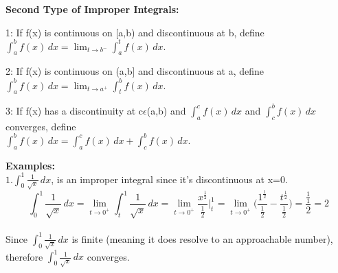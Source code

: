 \documentclass[12pt, letterpaper]{article}
\begin{document}
    \begin{flushleft}\textbf{Second Type of Improper Integrals:}\end{flushleft}
    \begin{description}
        \item 1: If f(x) is continuous on [a,b) and discontinuous at b, define\\$\int_a^bf(x)\,dx=\lim_{t \to b^-}\int_a^tf(x)\,dx$.
        \item 2: If f(x) is continuous on (a,b] and discontinuous at a, define\\$\int_a^bf(x)\,dx=\lim_{t \to a^+}\int_t^bf(x)\,dx$.
        \item 3: If f(x) has a discontinuity at c$\epsilon$(a,b) and $\int_a^cf(x)\,dx$ and $\int_c^bf(x)\,dx$ converges, define\\$\int_a^bf(x)\,dx=\int_a^cf(x)\,dx+\int_c^bf(x)\,dx$.
    \end{description}
    \begin{flushleft}
        \textbf{Examples:}\\
        $1. \int_0^1\frac{1}{\sqrt{x}}\,dx$, is an improper integral since it's discontinuous at x=0.\\
        $$\int_0^1\frac{1}{\sqrt{x}}\,dx=\lim_{t \to 0^+}\int_t^1\frac{1}{\sqrt{x}}\,dx=\lim_{t \to 0^+}\frac{x^{\frac{1}{2}}}{\frac{1}{2}}\bigg|_t^1=\lim_{t \to 0^+}\bigg(\frac{1^{\frac{1}{2}}}{\frac{1}{2}}-\frac{t^{\frac{1}{2}}}{\frac{1}{2}}\bigg)=\frac{\frac{1}{1}}{2}=2$$\\
        Since $\int_0^1\frac{1}{\sqrt{x}}\,dx$ is finite (meaning it does resolve to an approachable number), therefore $\int_0^1\frac{1}{\sqrt{x}}\,dx$ converges.
    \end{flushleft}
    \newpage
\end{document}

